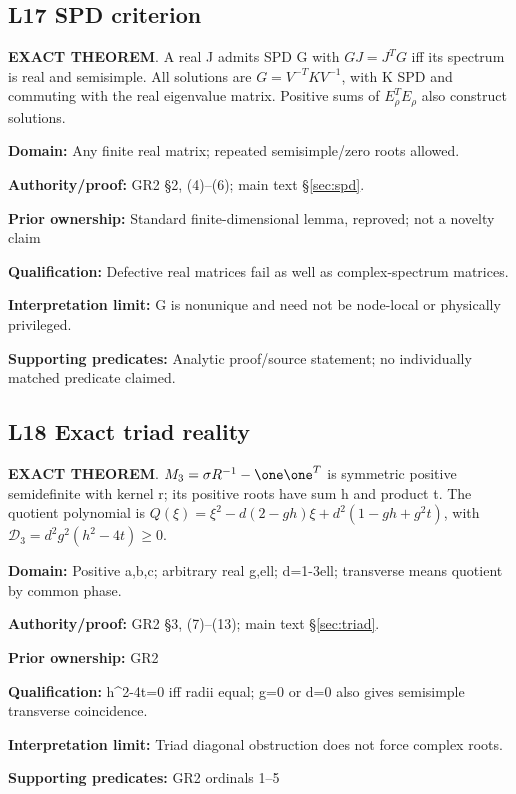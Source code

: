 \par\noindent\begin{minipage}{\linewidth}
\subsection*{L17 SPD criterion}
\textbf{EXACT THEOREM}. A real J admits SPD G with \(GJ=J^TG\) iff its spectrum is real and semisimple. All solutions are \(G=V^{-T}KV^{-1}\), with K SPD and commuting with the real eigenvalue matrix. Positive sums of \(E_\rho^TE_\rho\) also construct solutions.\par
\textbf{Domain:} Any finite real matrix; repeated semisimple/zero roots allowed.\par
\textbf{Authority/proof:} GR2 \S{}2, (4)--(6); main text \S\ref{sec:spd}.\par
\textbf{Prior ownership:} Standard finite-dimensional lemma, reproved; not a novelty claim\par
\textbf{Qualification:} Defective real matrices fail as well as complex-spectrum matrices.\par
\textbf{Interpretation limit:} G is nonunique and need not be node-local or physically privileged.\par
\textbf{Supporting predicates:} Analytic proof/source statement; no individually matched predicate claimed.\par
\end{minipage}\par\medskip
\par\noindent\begin{minipage}{\linewidth}
\subsection*{L18 Exact triad reality}
\textbf{EXACT THEOREM}. \(M_3=\sigma R^{-1}-\one\one^T\) is symmetric positive semidefinite with kernel r; its positive roots have sum h and product t. The quotient polynomial is \(Q(\xi)=\xi^2-d(2-gh)\xi+d^2(1-gh+g^2t)\), with \(\mathcal D_3=d^2g^2(h^2-4t)\ge0\).\par
\textbf{Domain:} Positive a,b,c; arbitrary real g,ell; d=1-3ell; transverse means quotient by common phase.\par
\textbf{Authority/proof:} GR2 \S{}3, (7)--(13); main text \S\ref{sec:triad}.\par
\textbf{Prior ownership:} GR2\par
\textbf{Qualification:} h\textasciicircum{}2-4t=0 iff radii equal; g=0 or d=0 also gives semisimple transverse coincidence.\par
\textbf{Interpretation limit:} Triad diagonal obstruction does not force complex roots.\par
\textbf{Supporting predicates:} GR2 ordinals 1--5\par
\end{minipage}\par\medskip
